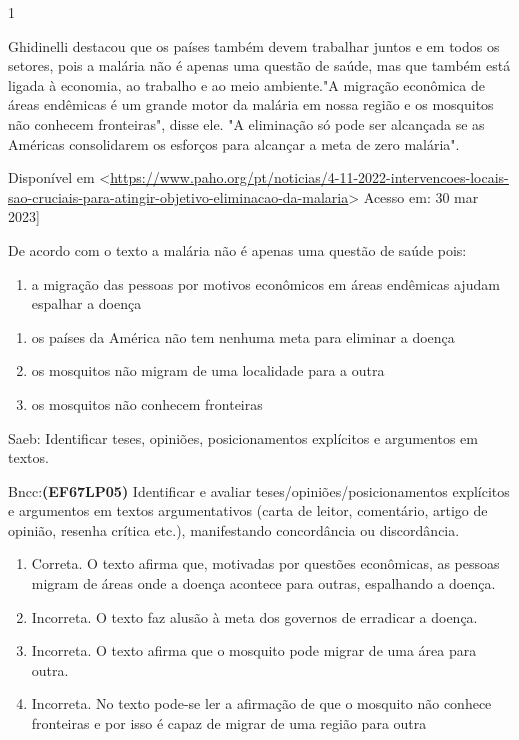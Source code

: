 {

\num{1}

Ghidinelli destacou que os países também devem trabalhar juntos e em
todos os setores, pois a malária não é apenas uma questão de saúde, mas
que também está ligada à economia, ao trabalho e ao meio ambiente."A
migração econômica de áreas endêmicas é um grande motor da malária em
nossa região e os mosquitos não conhecem fronteiras", disse ele. "A
eliminação só pode ser alcançada se as Américas consolidarem os esforços
para alcançar a meta de zero malária".

Disponível em
\textless{}\href{https://www.paho.org/pt/noticias/4-11-2022-intervencoes-locais-sao-cruciais-para-atingir-objetivo-eliminacao-da-malaria}{\uline{https://www.paho.org/pt/noticias/4-11-2022-intervencoes-locais-sao-cruciais-para-atingir-objetivo-eliminacao-da-malaria}}\textgreater{}
Acesso em: 30 mar 2023{]}

De acordo com o texto a malária não é apenas uma questão de saúde pois:

\begin{enumerate}
\def\labelenumi{\alph{enumi})}
\tightlist
\item
  a migração das pessoas por motivos econômicos em áreas endêmicas
  ajudam espalhar a doença
\end{enumerate}

\begin{enumerate}
\def\labelenumi{\alph{enumi})}
\item
  os países da América não tem nenhuma meta para eliminar a doença
\item
  os mosquitos não migram de uma localidade para a outra
\item
  os mosquitos não conhecem fronteiras
\end{enumerate}

Saeb: Identificar teses, opiniões, posicionamentos explícitos e
argumentos em textos.

Bncc:\textbf{(EF67LP05)} Identificar e avaliar
teses/opiniões/posicionamentos explícitos e argumentos em textos
argumentativos (carta de leitor, comentário, artigo de opinião, resenha
crítica etc.), manifestando concordância ou discordância.

\begin{enumerate}
\def\labelenumi{\arabic{enumi}.}
\item
  Correta. O texto afirma que, motivadas por questões econômicas, as
  pessoas migram de áreas onde a doença acontece para outras, espalhando
  a doença.
\item
  Incorreta. O texto faz alusão à meta dos governos de erradicar a
  doença.
\item
  Incorreta. O texto afirma que o mosquito pode migrar de uma área para
  outra.
\item
  Incorreta. No texto pode-se ler a afirmação de que o mosquito não
  conhece fronteiras e por isso é capaz de migrar de uma região para
  outra
\end{enumerate}

}
